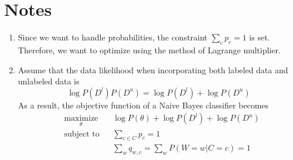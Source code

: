 \documentclass[11pt]{article}
\begin{document}
\section{Notes}
\begin{enumerate}
 \item Since we want to handle probabilities, the constraint $\sum_{c} p_c = 1$ is set. Therefore, we want to optimize using the method of Lagrange multiplier.
 \item Assume that the data likelihood when incorporating both labeled data and unlabeled data is \cite{Takamura2010}
$$\log P(D^{l})P(D^{u}) =\log P(D^{l}) + \log P(D^{u})$$
As a result, the objective function of a Naive Bayes classifier becomes 
\begin{equation*}
\begin{aligned}
& \underset{\theta}{\text{maximize}}
& & \log P(\theta) + \log P(D^{l}) + \log P(D^{u}) \\
& \text{subject to}
& & \sum_{c \in C} p_c = 1 \\
& 
& & \sum_{w} q_{w,c} = \sum_{w} P(W = w | C = c) = 1
\end{aligned}
\end{equation*}
\end{enumerate}

 



\end{document}
